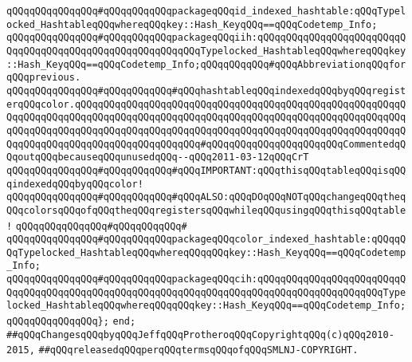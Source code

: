 \verb|qQQqqQQqqQQqqQQq#qQQqqQQqqQQqpackageqQQqid_indexed_hashtable:qQQqTypelocked_HashtableqQQqwhereqQQqkey::Hash_KeyqQQq==qQQqCodetemp_Info;|\newline
\verb|qQQqqQQqqQQqqQQq#qQQqqQQqqQQqpackageqQQqiih:qQQqqQQqqQQqqQQqqQQqqQQqqQQqqQQqqQQqqQQqqQQqqQQqqQQqqQQqqQQqTypelocked_HashtableqQQqwhereqQQqkey::Hash_KeyqQQq==qQQqCodetemp_Info;qQQqqQQqqQQq#qQQqAbbreviationqQQqforqQQqprevious.|\newline
\newline
\newline
\verb|qQQqqQQqqQQqqQQq#qQQqqQQqqQQq#qQQqhashtableqQQqindexedqQQqbyqQQqregisterqQQqcolor.qQQqqQQqqQQqqQQqqQQqqQQqqQQqqQQqqQQqqQQqqQQqqQQqqQQqqQQqqQQqqQQqqQQqqQQqqQQqqQQqqQQqqQQqqQQqqQQqqQQqqQQqqQQqqQQqqQQqqQQqqQQqqQQqqQQqqQQqqQQqqQQqqQQqqQQqqQQqqQQqqQQqqQQqqQQqqQQqqQQqqQQqqQQqqQQqqQQqqQQqqQQqqQQqqQQqqQQqqQQqqQQqqQQqqQQq#qQQqqQQqqQQqqQQqqQQqqQQqCommentedqQQqoutqQQqbecauseqQQqunusedqQQq--qQQq2011-03-12qQQqCrT|\newline
\verb|qQQqqQQqqQQqqQQq#qQQqqQQqqQQq#qQQqIMPORTANT:qQQqthisqQQqtableqQQqisqQQqindexedqQQqbyqQQqcolor!|\newline
\verb|qQQqqQQqqQQqqQQq#qQQqqQQqqQQq#qQQqALSO:qQQqDOqQQqNOTqQQqchangeqQQqtheqQQqcolorsqQQqofqQQqtheqQQqregistersqQQqwhileqQQqusingqQQqthisqQQqtable!|\newline
\verb|qQQqqQQqqQQqqQQq#qQQqqQQqqQQq#|\newline
\verb|qQQqqQQqqQQqqQQq#qQQqqQQqqQQqpackageqQQqcolor_indexed_hashtable:qQQqqQQqTypelocked_HashtableqQQqwhereqQQqqQQqkey::Hash_KeyqQQq==qQQqCodetemp_Info;|\newline
\verb|qQQqqQQqqQQqqQQq#qQQqqQQqqQQqpackageqQQqcih:qQQqqQQqqQQqqQQqqQQqqQQqqQQqqQQqqQQqqQQqqQQqqQQqqQQqqQQqqQQqqQQqqQQqqQQqqQQqqQQqqQQqqQQqqQQqTypelocked_HashtableqQQqwhereqQQqqQQqkey::Hash_KeyqQQq==qQQqCodetemp_Info;|\newline
\verb|qQQqqQQqqQQqqQQq};|\newline
\verb|end;|\newline
\newline
\verb|##qQQqChangesqQQqbyqQQqJeffqQQqProtheroqQQqCopyrightqQQq(c)qQQq2010-2015,|\newline
\verb|##qQQqreleasedqQQqperqQQqtermsqQQqofqQQqSMLNJ-COPYRIGHT.|\newline

